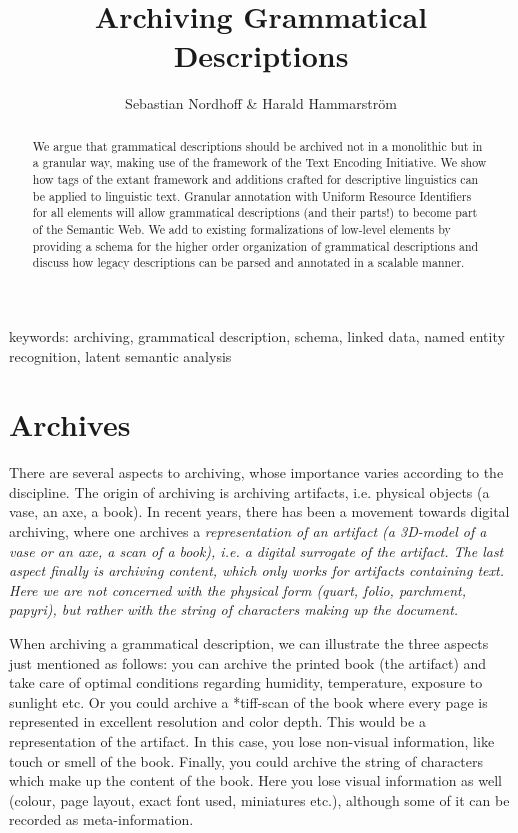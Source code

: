 \documentclass[a4paper,10pt]{article}
\title{Archiving Grammatical Descriptions}
\author{Sebastian Nordhoff \& Harald Hammarstr\"om}
\begin{document}
\maketitle

\begin{abstract}
  We argue that grammatical descriptions should be archived not in a monolithic but in a granular way, making use of the framework of the Text Encoding Initiative. We show how tags of the extant framework and additions crafted for descriptive linguistics can be applied to linguistic text. Granular annotation with Uniform Resource Identifiers for all elements will allow grammatical descriptions (and their parts!) to become part of the Semantic Web. We add to existing formalizations of low-level elements by providing a schema for the higher order organization of grammatical descriptions and discuss how legacy descriptions can be parsed and annotated in a scalable manner.
\end{abstract}

keywords: archiving, grammatical description, schema, linked data, named entity recognition, latent semantic analysis

\section{Archives}
There are several aspects to archiving, whose importance varies according to the discipline. The  origin of archiving is archiving artifacts, i.e. physical objects (a vase, an axe, a book). In  recent years, there has been a movement towards digital archiving, where one archives a \em representation \em of an artifact (a 3D-model of a vase or an axe, a scan of a book), i.e. a digital surrogate of the artifact. The last aspect finally is archiving content, which only works for artifacts containing text. Here we are not concerned with the physical form (quart, folio, parchment, papyri), but rather with the string of characters making up the document.  

When archiving a grammatical description, we can illustrate the three aspects just mentioned as follows: you can archive the printed book (the artifact) and take care of optimal conditions regarding humidity, temperature, exposure to sunlight etc. Or you could archive a *tiff-scan of the book where every page is represented in excellent resolution and color depth. This would be a representation of the artifact. In this case, you lose non-visual information, like touch or smell of the book. Finally, you could archive the string of characters which make up the content of the book. Here you lose visual information as well (colour, page layout, exact font used, miniatures etc.), although some of it can be recorded as meta-information.
\end{document}
